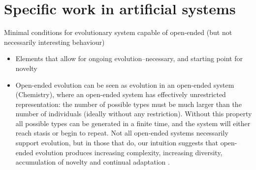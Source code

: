 \section{Specific work in artificial systems}

Minimal conditions for evolutionary system capable of open-ended (but not necessarily interesting behaviour)

\begin{itemize}
	\item
	      Elements that allow for ongoing evolution--necessary, and starting
	      point for novelty
	\item
	      Open-ended evolution can be seen as evolution in an open-ended system
	      (\eg Chemistry), where an open-ended system has effectively
	      unrestricted representation: the number of possible types must be much
	      larger than the number of individuals (ideally without any
	      restriction). Without this property all possible types can be
	      generated in a finite time, and the system will either reach stasis or
	      begin to repeat. Not all open-ended systems necessarily support
	      evolution, but in those that do, our intuition suggests that
	      open-ended evolution produces increasing complexity, increasing
	      diversity, accumulation of novelty and continual adaptation
	      \autocite{Lehman2012}.
\end{itemize}

{\autocite{Ruiz-Mirazo2004}}

